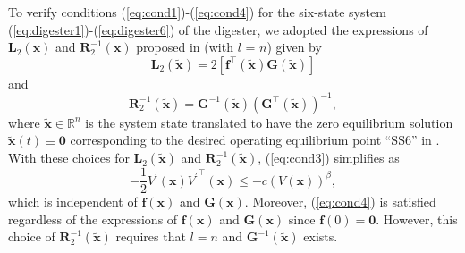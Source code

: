 \documentclass[lettersize,journal]{IEEEtran}
\begin{document}
To verify conditions (\ref{eq:cond1})-(\ref{eq:cond4}) for the six-state system (\ref{eq:digester1})-(\ref{eq:digester6}) of the digester, we adopted the expressions of $\bm{L}_2(\bm{x})$ and $\bm{R}^{-1}_2(\bm{x})$ proposed in \cite{zocco2023thermodynamical} (with $l$ = $n$) given by
\begin{equation}\label{L2choice}
\bm{L}_2(\tilde{\bm{x}}) = 2\left[\bm{f}^\top(\tilde{\bm{x}})\bm{G}(\tilde{\bm{x}})\right]
\end{equation}
and
\begin{equation}\label{eq:R2choice}
\bm{R}^{-1}_2(\tilde{\bm{x}}) = \bm{G}^{-1}(\tilde{\bm{x}})(\bm{G}^\top(\tilde{\bm{x}}))^{-1},
\end{equation}
where $\tilde{\bm{x}} \in \mathbb{R}^{n}$ is the system state translated to have the zero equilibrium solution $\tilde{\bm{x}}(t) \equiv \bm{0}$ corresponding to the desired operating equilibrium point ``SS6'' in \cite{campos2019hybrid}. With these choices for $\bm{L}_2(\tilde{\bm{x}})$ and $\bm{R}^{-1}_2(\tilde{\bm{x}})$, (\ref{eq:cond3}) simplifies as
\begin{equation}
-\frac{1}{2}V^\prime(\bm{x}) {V^\prime}^\top(\bm{x}) \leq -c(V(\bm{x}))^\beta,
\end{equation}
which is independent of $\bm{f}(\bm{x})$ and $\bm{G}(\bm{x})$. Moreover, (\ref{eq:cond4}) is satisfied regardless of the expressions of $\bm{f}(\bm{x})$ and $\bm{G}(\bm{x})$ since $\bm{f}(0) = \bm{0}$. However, this choice of $\bm{R}^{-1}_2(\tilde{\bm{x}})$ requires that $l = n$ and $\bm{G}^{-1}(\tilde{\bm{x}})$ exists. 
\end{document}
